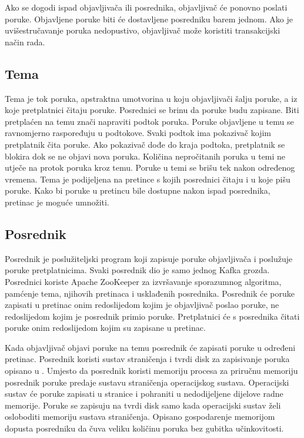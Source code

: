 \documentclass[times, utf8, diplomski, numeric]{fer}
\begin{document}
Ako se dogodi ispad objavljivača ili posrednika, objavljivač će ponovno poslati poruke. Objavljene poruke biti će dostavljene posredniku barem jednom. Ako je uvišestručavanje poruka nedopustivo, objavljivač može koristiti transakcijski način rada.

\subsection{Tema}
Tema je tok poruka, apstraktna umotvorina u koju objavljivači šalju poruke, a iz koje pretplatnici čitaju poruke. Posrednici se brinu da poruke budu zapisane. Biti pretplaćen na temu znači napraviti podtok poruka. Poruke objavljene u temu se ravnomjerno raspoređuju u podtokove. Svaki podtok ima pokazivač kojim pretplatnik čita poruke. Ako pokazivač dođe do kraja podtoka, pretplatnik se blokira dok se ne objavi nova poruka. Količina nepročitanih poruka u temi ne utječe na protok poruka kroz temu. Poruke u temi se brišu tek nakon određenog vremena. Tema je podijeljena na pretince s kojih posrednici čitaju i u koje pišu poruke. Kako bi poruke u pretincu bile dostupne nakon ispad posrednika, pretinac je moguće umnožiti.

\subsection{Posrednik}
Posrednik je poslužiteljski program koji zapisuje poruke objavljivača i poslužuje poruke pretplatnicima. Svaki posrednik dio je samo jednog Kafka grozda. Posrednici koriste Apache ZooKeeper za izvršavanje sporazumnog algoritma, pamćenje tema, njihovih pretinaca i usklađenih posrednika. Posrednik će poruke zapisati u pretinac onim redoslijedom kojim je objavljivač poslao poruke, ne redoslijedom kojim je posrednik primio poruke. Pretplatnici će s posrednika čitati poruke onim redoslijedom kojim su zapisane u pretinac.

Kada objavljivač objavi poruke na temu posrednik će zapisati poruke u određeni pretinac. Posrednik koristi sustav straničenja i tvrdi disk za zapisivanje poruka opisano u \cite{kafka-paging}. Umjesto da posrednik koristi memoriju procesa za priručnu memoriju posrednik poruke predaje sustavu straničenja operacijskog sustava. Operacijski sustav će poruke zapisati u stranice i pohraniti u nedodijeljene dijelove radne memorije. Poruke se zapisuju na tvrdi disk samo kada operacijski sustav želi osloboditi memoriju sustava straničenja. Opisano gospodarenje memorijom dopusta posredniku da čuva veliku količinu poruka bez gubitka učinkovitosti.
\end{document}
